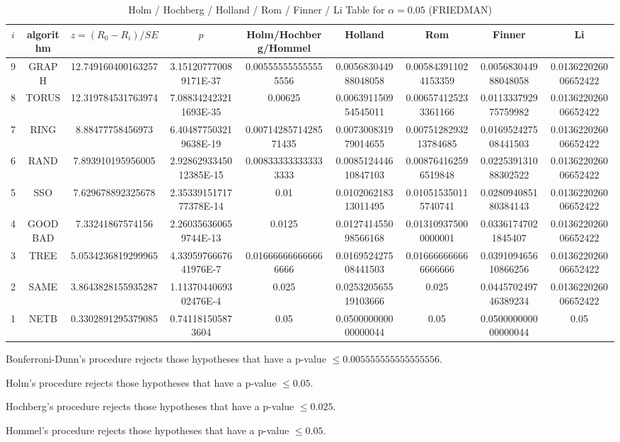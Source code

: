 \documentclass[a4paper,10pt]{article}
\begin{document}
\begin{landscape}
\begin{table}[!htp]
\centering\scriptsize
\caption{Holm / Hochberg / Holland / Rom / Finner / Li Table for $\alpha=0.05$ (FRIEDMAN)}
\begin{tabular}{ccccccccc}
$i$&algorithm&$z=(R_0 - R_i)/SE$&$p$&Holm/Hochberg/Hommel&Holland&Rom&Finner&Li\\
\hline
9& GRAPH&12.749160400163257&3.151207770089171E-37&0.005555555555555556&0.005683044988048058&0.005843911024153359&0.005683044988048058&0.013622026006652422\\
8& TORUS&12.319784531763974&7.088342423211693E-35&0.00625&0.006391150954545011&0.006574125233361166&0.011333792975759982&0.013622026006652422\\
7& RING&8.88477758456973&6.404877503219638E-19&0.0071428571428571435&0.007300831979014655&0.0075128293213784685&0.016952427508441503&0.013622026006652422\\
6& RAND&7.893910195956005&2.9286293345012385E-15&0.008333333333333333&0.008512444610847103&0.008764162596519848&0.022539131088302522&0.013622026006652422\\
5& SSO&7.629678892325678&2.3533915171777378E-14&0.01&0.010206218313011495&0.010515350115740741&0.028094085180384143&0.013622026006652422\\
4& GOODBAD&7.33241867574156&2.260356360659744E-13&0.0125&0.012741455098566168&0.013109375000000001&0.03361747021845407&0.013622026006652422\\
3& TREE&5.0534236819299965&4.3395976667641976E-7&0.016666666666666666&0.016952427508441503&0.016666666666666666&0.039109465610866256&0.013622026006652422\\
2& SAME&3.8643828155935287&1.1137044069302476E-4&0.025&0.025320565519103666&0.025&0.044570249746389234&0.013622026006652422\\
1& NETB&0.3302891295379085&0.741181505873604&0.05&0.050000000000000044&0.05&0.050000000000000044&0.05\\
\hline
\end{tabular}
\end{table}
Bonferroni-Dunn's procedure rejects those hypotheses that have a p-value $\le0.005555555555555556$.


Holm's procedure rejects those hypotheses that have a p-value $\le0.05$.


Hochberg's procedure rejects those hypotheses that have a p-value $\le0.025$.


Hommel's procedure rejects those hypotheses that have a p-value $\le0.05$.



\end{landscape}
\end{document}
